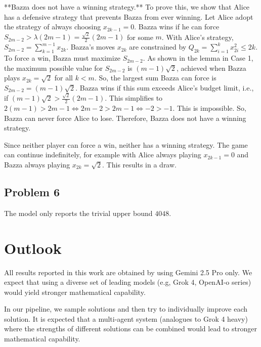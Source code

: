 \documentclass[12pt]{article}
\begin{document}
**Bazza does not have a winning strategy.**
To prove this, we show that Alice has a defensive strategy that prevents Bazza from ever winning. Let Alice adopt the strategy of always choosing $x_{2k-1}=0$.
Bazza wins if he can force $S_{2m-2} > \lambda(2m-1) = \frac{\sqrt{2}}{2}(2m-1)$ for some $m$.
With Alice's strategy, $S_{2m-2} = \sum_{k=1}^{m-1} x_{2k}$. Bazza's moves $x_{2k}$ are constrained by $Q_{2k} = \sum_{i=1}^k x_{2i}^2 \le 2k$.
To force a win, Bazza must maximize $S_{2m-2}$. As shown in the lemma in Case 1, the maximum possible value for $S_{2m-2}$ is $(m-1)\sqrt{2}$, achieved when Bazza plays $x_{2k}=\sqrt{2}$ for all $k<m$.
So, the largest sum Bazza can force is $S_{2m-2}=(m-1)\sqrt{2}$. Bazza wins if this sum exceeds Alice's budget limit, i.e., if $(m-1)\sqrt{2} > \frac{\sqrt{2}}{2}(2m-1)$. This simplifies to $2(m-1) > 2m-1 \iff 2m-2 > 2m-1 \iff -2 > -1$. This is impossible.
So, Bazza can never force Alice to lose. Therefore, Bazza does not have a winning strategy.

Since neither player can force a win, neither has a winning strategy. The game can continue indefinitely, for example with Alice always playing $x_{2k-1}=0$ and Bazza always playing $x_{2k}=\sqrt{2}$. This results in a draw.

\subsection{Problem 6}

The model only reports the trivial upper bound $4048$.

\section{Outlook}

All results reported in this work are obtained by using Gemini 2.5 Pro only. We expect that using a diverse set of leading models (e.g, Grok 4, OpenAI-o series) would yield stronger mathematical capability.

In our pipeline, we sample solutions and then try to individually improve each solution. It is expected that a multi-agent system (analogues to Grok 4 heavy) where the strengths of different solutions can be combined would lead to stronger mathematical capability.



\end{document}
